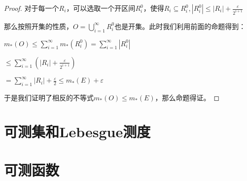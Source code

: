 \documentclass[12pt, a4paper, oneside, UTF8]{ctexbook}
\begin{document}
\begin{para}{0}
\begin{proof}
					对于每一个$R_i$，可以选取一个开区间$R_i^0$，使得$R_i \subseteq R_i^0,|R_i^0| \leqslant |R_i| + \frac{\varepsilon}{2^{i+1}}$
					
					那么按照开集的性质，$O = \bigcup\limits_{i=1}^{\infty} R_i^0$也是开集。此时我们利用前面的命题得到：
					
					$m_*(O) \leqslant \sum\limits_{i=1}^{\infty} m_*(R_i^0) = \sum\limits_{i=1}^{\infty} |R_i^0|$
					
					$\leqslant \sum\limits_{i=1}^{\infty} \left(|R_i| + \frac{\varepsilon}{2^{i+1}}\right)$
					
					$=\sum\limits_{i=1}^{\infty} |R_i| + \frac{\varepsilon}{2} \leqslant m_*(E) + \varepsilon$
					
					于是我们证明了相反的不等式$m_*(O) \leqslant m_*(E)$，那么命题得证。
				\end{proof}
		\end{para}
	\section{可测集和Lebesgue测度}
	\section{可测函数}
\ifx\allfiles\undefined
\end{document}
